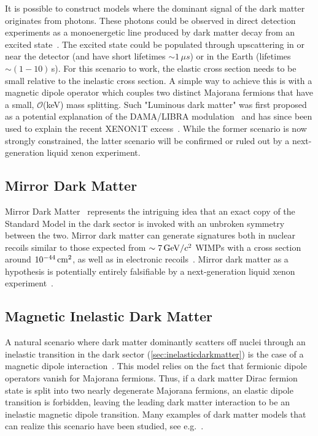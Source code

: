 It is possible to construct models where the dominant signal of the dark matter originates from photons. These photons could be observed in direct detection experiments as a monoenergetic line produced by dark matter decay from an excited state~\cite{Feldstein:2010su,Pospelov:2013nea}. The excited state could be populated through upscattering in or near the detector (and have short lifetimes $\sim1\,\mu s$) or in the Earth (lifetimes $\sim(1-10)$\,s). For this scenario to work, the elastic cross section needs to be small relative to the inelastic cross section. A simple way to achieve this is with a magnetic dipole operator which couples two distinct Majorana fermions that have a small, $\mathcal{O}$(keV) mass splitting. Such "Luminous dark matter" was first proposed as a potential explanation of the DAMA/LIBRA modulation~\cite{Feldstein:2010su} and has since been used to explain the recent XENON1T excess~\cite{Bell:2020bes}. While the former scenario is now strongly constrained, the latter scenario will be confirmed or ruled out by a next-generation liquid xenon experiment.

\subsection{Mirror Dark Matter}\label{sec:mirrordm} %

Mirror Dark Matter~\cite{Foot:2007nn} represents the intriguing idea that an exact copy of the Standard Model in the dark sector is invoked with an unbroken symmetry between the two. Mirror dark matter can generate signatures both in nuclear recoils similar to those expected from $\sim 7\, \mathrm{GeV}/c^2$ WIMPs with a cross section around $10^{-44}\, \mathrm{cm^2}$, as well as in electronic recoils~\cite{Foot:2010hu,Foot:2014mia,Foot:2018jpo}. Mirror dark matter as a hypothesis is potentially entirely falsifiable by a next-generation liquid xenon experiment~\cite{Clarke:2016eac}.

\subsection{Magnetic Inelastic Dark Matter}\label{sec:maginelasticdm}

A natural scenario where dark matter dominantly scatters off nuclei through an inelastic transition in the dark sector (\autoref{sec:inelasticdarkmatter}) is the case of a magnetic dipole interaction~\cite{Chang:2010en}. This model relies on the fact that fermionic dipole operators vanish for Majorana fermions. Thus, if a dark matter Dirac fermion state is split into two nearly degenerate Majorana fermions, an elastic dipole transition is forbidden, leaving the leading dark matter interaction to be an inelastic magnetic dipole transition. Many examples of dark matter models that can realize this scenario have been studied, see e.g.~\cite{Kumar:2011iy,Patra:2011aa,Weiner:2012gm, Pierce:2014spa}.   

